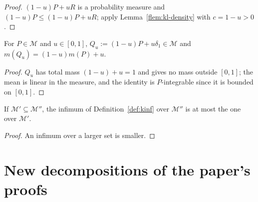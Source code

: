 \documentclass[11pt]{article}
\begin{document}
\begin{proof}
$(1-u)P+uR$ is a probability measure and $(1-u)P\le(1-u)P+uR$; apply
Lemma~\ref{flem:kl-density} with $c=1-u>0$.
\end{proof}

\begin{lemma}\label{flem:mixture-in-M}
For $P\in\mathcal M$ and $u\in[0,1]$, $Q_u:=(1-u)P+u\delta_1\in\mathcal M$ and
$m(Q_u)=(1-u)m(P)+u$.
\end{lemma}

\begin{proof}
$Q_u$ has total mass $(1-u)+u=1$ and gives no mass outside $[0,1]$; the mean is linear in the
measure, and the identity is $P$-integrable since it is bounded on $[0,1]$.
\end{proof}

\begin{lemma}\label{flem:dinf-anti}
If $\mathcal M'\subseteq\mathcal M''$, the infimum of Definition~\ref{def:kinf} over $\mathcal M''$
is at most the one over $\mathcal M'$.
\end{lemma}

\begin{proof}
An infimum over a larger set is smaller.
\end{proof}

\section{New decompositions of the paper's proofs}
\end{document}
